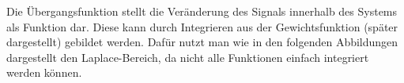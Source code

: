 Die Übergangsfunktion stellt die Veränderung des Signals innerhalb des Systems als Funktion dar. Diese
kann durch Integrieren aus der Gewichtsfunktion (später dargestellt) gebildet werden. Dafür nutzt man wie
in den folgenden Abbildungen dargestellt den Laplace-Bereich, da nicht alle Funktionen einfach integriert
werden können.
\vspace*{0.5cm}
\begin{figure}[H]
    \begin{center}
    \end{center}
\end{figure}
\vspace*{0.5cm}